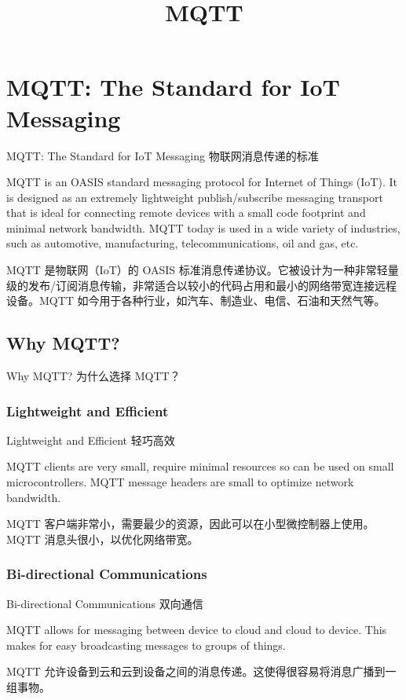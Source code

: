\documentclass{ctexbook}
\title{MQTT}
\author{}
\date{}
\begin{document}
\maketitle
\tableofcontents

\chapter{MQTT: The Standard for IoT Messaging}
MQTT: The Standard for IoT Messaging 物联网消息传递的标准

MQTT is an OASIS standard messaging protocol for Internet of Things (IoT). It is designed as an extremely lightweight publish/subscribe messaging transport that is ideal for connecting remote devices with a small code footprint and minimal network bandwidth. MQTT today is used in a wide variety of industries, such as automotive, manufacturing, telecommunications, oil and gas, etc.

MQTT 是物联网（IoT）的 OASIS 标准消息传递协议。它被设计为一种非常轻量级的发布/订阅消息传输，非常适合以较小的代码占用和最小的网络带宽连接远程设备。MQTT 如今用于各种行业，如汽车、制造业、电信、石油和天然气等。

\section{Why MQTT?}
Why MQTT? 为什么选择 MQTT？

\subsection{Lightweight and Efficient}
Lightweight and Efficient 轻巧高效

MQTT clients are very small, require minimal resources so can be used on small microcontrollers. MQTT message headers are small to optimize network bandwidth.

MQTT 客户端非常小，需要最少的资源，因此可以在小型微控制器上使用。MQTT 消息头很小，以优化网络带宽。

\subsection{Bi-directional Communications}
Bi-directional Communications 双向通信

MQTT allows for messaging between device to cloud and cloud to device. This makes for easy broadcasting messages to groups of things.

MQTT 允许设备到云和云到设备之间的消息传递。这使得很容易将消息广播到一组事物。
\end{document}

